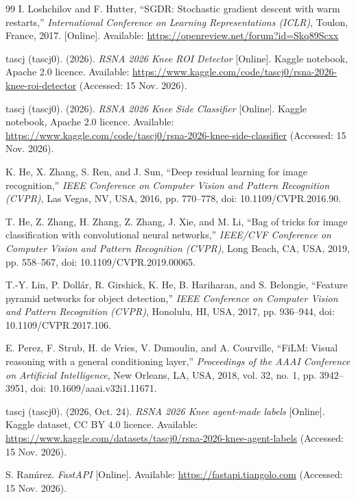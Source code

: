 \begin{thebibliography}{99}
 I. Loshchilov and F. Hutter, ``SGDR: Stochastic gradient descent with warm restarts,'' \textit{International Conference on Learning Representations (ICLR)}, Toulon, France, 2017. [Online]. Available: \url{https://openreview.net/forum?id=Skq89Scxx}

 tascj (tascj0). (2026). \textit{RSNA 2026 Knee ROI Detector} [Online]. Kaggle notebook, Apache 2.0 licence. Available: \url{https://www.kaggle.com/code/tascj0/rsna-2026-knee-roi-detector} (Accessed: 15 Nov. 2026).

 tascj (tascj0). (2026). \textit{RSNA 2026 Knee Side Classifier} [Online]. Kaggle notebook, Apache 2.0 licence. Available: \url{https://www.kaggle.com/code/tascj0/rsna-2026-knee-side-classifier} (Accessed: 15 Nov. 2026).

 K. He, X. Zhang, S. Ren, and J. Sun, ``Deep residual learning for image recognition,'' \textit{IEEE Conference on Computer Vision and Pattern Recognition (CVPR)}, Las Vegas, NV, USA, 2016, pp. 770--778, doi: 10.1109/CVPR.2016.90.

 T. He, Z. Zhang, H. Zhang, Z. Zhang, J. Xie, and M. Li, ``Bag of tricks for image classification with convolutional neural networks,'' \textit{IEEE/CVF Conference on Computer Vision and Pattern Recognition (CVPR)}, Long Beach, CA, USA, 2019, pp. 558--567, doi: 10.1109/CVPR.2019.00065.

 T.-Y. Lin, P. Doll\'{a}r, R. Girshick, K. He, B. Hariharan, and S. Belongie, ``Feature pyramid networks for object detection,'' \textit{IEEE Conference on Computer Vision and Pattern Recognition (CVPR)}, Honolulu, HI, USA, 2017, pp. 936--944, doi: 10.1109/CVPR.2017.106.

 E. Perez, F. Strub, H. de Vries, V. Dumoulin, and A. Courville, ``FiLM: Visual reasoning with a general conditioning layer,'' \textit{Proceedings of the AAAI Conference on Artificial Intelligence}, New Orleans, LA, USA, 2018, vol. 32, no. 1, pp. 3942--3951, doi: 10.1609/aaai.v32i1.11671.

 tascj (tascj0). (2026, Oct. 24). \textit{RSNA 2026 Knee agent-made labels} [Online]. Kaggle dataset, CC BY 4.0 licence. Available: \url{https://www.kaggle.com/datasets/tascj0/rsna-2026-knee-agent-labels} (Accessed: 15 Nov. 2026).

 S. Ram\'{\i}rez. \textit{FastAPI} [Online]. Available: \url{https://fastapi.tiangolo.com} (Accessed: 15 Nov. 2026).


\end{thebibliography}
